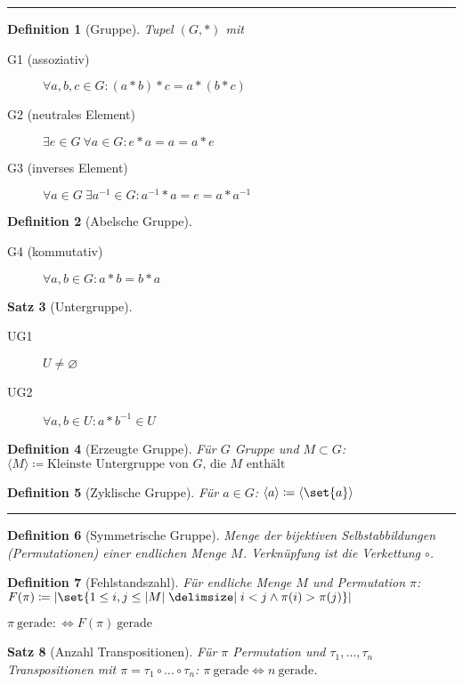 \documentclass[a4paper]{article}
\newcounter{Sec}
\theoremstyle{marginbreak}
\newtheorem{definition}{Definition}[Sec]
\newtheorem{satz}[definition]{Satz}
\newcommand{\sep}{%
	\rule{\textwidth}{0.3pt}%
	\stepcounter{Sec}%
	}
\begin{document}
	\sep
	\begin{definition}[Gruppe]
		Tupel $(G, *)$ mit
		\begin{description}
			\item[G1 (assoziativ)] $\forall a, b, c \in G: (a * b) * c = a * (b * c)$
			\item[G2 (neutrales Element)] $\exists e \in G~\forall a \in G: e * a = a = a * e$
			\item[G3 (inverses Element)] $\forall a \in G~\exists a^{-1} \in G: a^{-1} * a = e = a * a^{-1}$
		\end{description}
	\end{definition}
	\begin{definition}[Abelsche Gruppe]
		\begin{description}
			\item[G4 (kommutativ)] $\forall a, b \in G: a * b = b * a$
		\end{description}
	\end{definition}
	\begin{satz}[Untergruppe]
		\begin{description}
			\item[UG1] $U \neq \varnothing$
			\item[UG2] $\forall a, b \in U: a * b^{-1} \in U$
		\end{description}
	\end{satz}
	\begin{definition}[Erzeugte Gruppe]
		Für $G$ Gruppe und $M \subset G$: $\langle M\rangle \coloneqq \text{Kleinste Untergruppe von $G$, die $M$ enthält}$
	\end{definition}
	\begin{definition}[Zyklische Gruppe]
		Für $a \in G$: $\langle a\rangle \coloneqq \langle\set{a}\rangle$
	\end{definition}
	\sep
	\begin{definition}[Symmetrische Gruppe]
		Menge der bijektiven Selbstabbildungen (Permutationen) einer endlichen Menge $M$.
		Verknüpfung ist die Verkettung $\circ$.
	\end{definition}
	\begin{definition}[Fehlstandszahl]
		Für endliche Menge $M$ und Permutation $\pi$:
		$F(\pi) \coloneqq \abs{\set{1 \leq i, j \leq \abs{M} \given i < j \wedge \pi(i) > \pi(j)}}$

		$\pi~\text{gerade} :\Longleftrightarrow F(\pi)~\text{gerade}$
	\end{definition}
	\begin{satz}[Anzahl Transpositionen]
		Für $\pi$ Permutation und $\tau_1, \ldots, \tau_n$ Transpositionen mit
		$\pi = \tau_1 \circ \ldots \circ \tau_n$: $\pi~\text{gerade} \iff n~\text{gerade}$.
	\end{satz}
\end{document}
